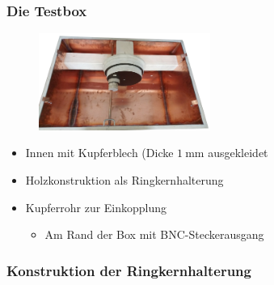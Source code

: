 \documentclass[accentcolor=tud9b, colorbacktitle, inverttitle]{tudbeamer}
\begin{document}
\begin{frame}\frametitle{Die Testbox}
\begin{multicols}{2}
\vspace{-2em}
	\begin{figure}[h]
		\centering
		\includegraphics[width=0.5\textwidth]{boxleer}
	\end{figure}
	\vfill\null
	\columnbreak
	\begin{itemize}
		\item Innen mit Kupferblech (Dicke $\SI{1}{\milli\meter}$ ausgekleidet
		\item Holzkonstruktion als Ringkernhalterung
		\item Kupferrohr zur Einkopplung
		\begin{itemize}
			\item Am Rand der Box mit BNC-Steckerausgang 
		\end{itemize}
	\end{itemize}
\end{multicols}
\end{frame}


\begin{frame}\frametitle{Konstruktion der Ringkernhalterung}

\end{frame}
\end{document}
